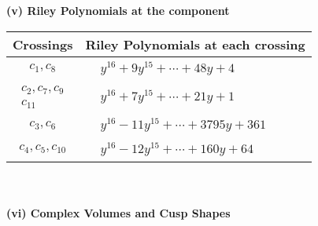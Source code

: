 \documentclass[1p]{elsarticle_modified}
\theoremstyle{definition}
\begin{document}
\newpage\renewcommand{\arraystretch}{1}
\flushleft \textbf{(v) Riley Polynomials at the component}\newline \\
\begin{tabular}{m{50pt}|m{274pt}}
Crossings & \hspace{64pt}Riley Polynomials at each crossing \\
\hline $$\begin{aligned}c_{1},c_{8}\end{aligned}$$&$\begin{aligned}
&y^{16}+9 y^{15}+\cdots+48 y+4
\end{aligned}$\\
\hline $$\begin{aligned}c_{2},c_{7},c_{9}\\c_{11}\end{aligned}$$&$\begin{aligned}
&y^{16}+7 y^{15}+\cdots+21 y+1
\end{aligned}$\\
\hline $$\begin{aligned}c_{3},c_{6}\end{aligned}$$&$\begin{aligned}
&y^{16}-11 y^{15}+\cdots+3795 y+361
\end{aligned}$\\
\hline $$\begin{aligned}c_{4},c_{5},c_{10}\end{aligned}$$&$\begin{aligned}
&y^{16}-12 y^{15}+\cdots+160 y+64
\end{aligned}$\\
\hline
\end{tabular}\\~\\
\newpage\flushleft \textbf{(vi) Complex Volumes and Cusp Shapes}
\end{document}
